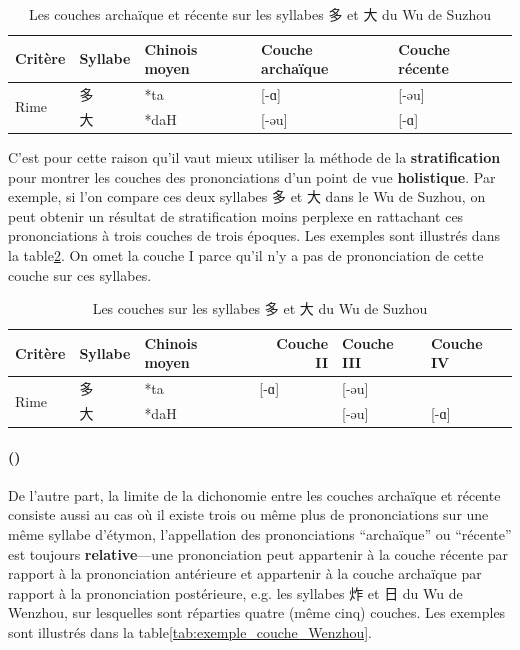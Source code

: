 \documentclass{scrbook}
\newcounter{c}[subsubsection]
\newcommand{\stpc}[1]{\stepcounter{#1}}
\newcommand{\difwenbai}{couches archaïque et récente\xspace}
\newcommand{\illustre}{Les exemples sont illustrés dans la table\xspace}
\begin{document}
\begin{sloppypar}
\begin{table}[htbp]
  \centering
    \begin{tabular}{lllll}
    \toprule
    Critère & Syllabe & Chinois moyen  & Couche archaïque & Couche récente \\
    \midrule
    \multirow{2}[2]{*}{Rime} & 多     & *ta   & [-ɑ]  & [-əu] \\
          & 大     & *daH  & [-əu] & [-ɑ] \\
    \bottomrule
    \end{tabular}%
  \caption{Les \difwenbai sur les syllabes 多 et 大 du Wu de Suzhou}
  \label{tab:exemple_wenbai_Suzhou}%
\end{table}%

C'est pour cette raison qu'il vaut mieux utiliser la méthode de la \textbf{stratification} pour montrer les couches des prononciations d'un point de vue \textbf{holistique}. Par exemple, si l'on compare ces deux syllabes 多 et 大 dans le Wu de Suzhou, on peut obtenir un résultat de stratification moins perplexe en rattachant ces prononciations à trois couches de trois époques. \illustre \ref{tab:exemple_couche_Suzhou}. On omet la couche I parce qu'il n'y a pas de prononciation de cette couche sur ces syllabes.

\begin{table}[htbp]
  \centering
    \begin{tabular}{lllrll}
    \toprule
    Critère & Syllabe & Chinois moyen  & Couche II & Couche III & Couche IV \\
    \midrule
    \multirow{2}[2]{*}{Rime} & 多     & *ta   & \multicolumn{1}{l}{[-ɑ]} & [-əu] &  \\
          & 大     & *daH  &       & [-əu] & [-ɑ] \\
    \bottomrule
    \end{tabular}%
  \caption{Les couches sur les syllabes 多 et 大 du Wu de Suzhou}
  \label{tab:exemple_couche_Suzhou}%
\end{table}%

\stpc{c}\paragraph{()}
De l'autre part, la limite de la dichonomie entre les \difwenbai consiste aussi au cas où il existe trois ou même plus de prononciations sur une même syllabe d'étymon, l'appellation des prononciations ``archaïque'' ou ``récente'' est toujours \textbf{relative}---une prononciation peut appartenir à la couche récente par rapport à la prononciation antérieure et appartenir à la couche archaïque par rapport à la prononciation postérieure, e.g. les syllabes 炸 et 日 du Wu de Wenzhou, sur lesquelles sont réparties quatre (même cinq) couches. \illustre \ref{tab:exemple_couche_Wenzhou}.


\end{sloppypar}
\end{document}
